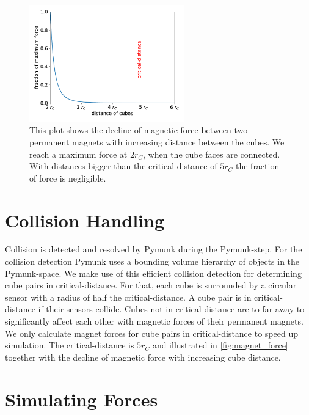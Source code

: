 \begin{figure}
	\centering
	\includegraphics[width=0.6\textwidth]{figures/plots/magnet_force.pdf}
	\caption[Declining magnetic forces with increasing cube distance.]{This plot shows the decline of magnetic force between two permanent magnets with increasing distance between the cubes. We reach a maximum force at $2 r_C$, when the cube faces are connected. With distances bigger than the critical-distance of $5 r_C$ the fraction of force is negligible.}
	\label{fig:magnet_force}
\end{figure}

\section{Collision Handling}
\label{sec:coll_handling}

Collision is detected and resolved by Pymunk during the Pymunk-step.
For the collision detection Pymunk uses a bounding volume hierarchy of objects in the Pymunk-space.
We make use of this efficient collision detection for determining cube pairs in critical-distance.
For that, each cube is surrounded by a circular sensor with a radius of half the critical-distance.
A cube pair is in critical-distance if their sensors collide.
Cubes not in critical-distance are to far away to significantly affect each other with magnetic forces of their permanent magnets.
We only calculate magnet forces for cube pairs in critical-distance to speed up simulation.
The critical-distance is $5 r_C$ and illustrated in \autoref{fig:magnet_force} together with the decline of magnetic force with increasing cube distance.

\section{Simulating Forces}



